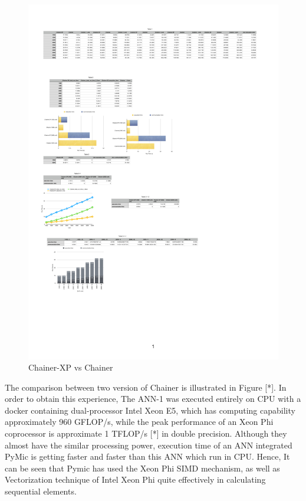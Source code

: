 \begin{figure}[]
\centering
\includegraphics[scale=0.6]{img/c.pdf}
\caption{Chainer-XP vs Chainer}
\end{figure}

The comparison between two version of Chainer is illustrated in Figure [*]. In order to obtain this experience, The ANN-1 was executed entirely on CPU with a docker containing dual-processor Intel Xeon E5, which has computing capability approximately 960 GFLOP/s, while the peak performance of an Xeon Phi coprocessor is approximate 1 TFLOP/s [*] in double precision. Although they almost have the similar processing power, execution time of an ANN integrated PyMic  is getting faster and faster than this ANN which run in CPU. Hence, It can be seen that Pymic has used the Xeon Phi SIMD mechanism, as well as Vectorization technique of Intel Xeon Phi quite effectively in calculating sequential elements.
